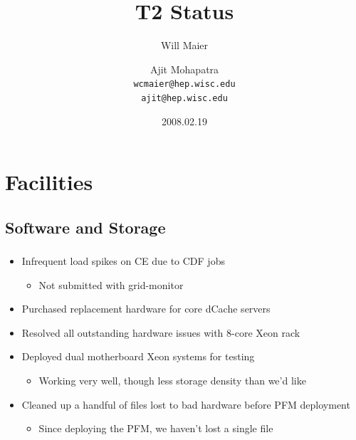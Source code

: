\documentclass{beamer}
\title{T2 Status}
\author[Maier, Mohapatra]{
    Will Maier \and Ajit Mohapatra\\ 
    {\tt wcmaier@hep.wisc.edu}\\
    {\tt ajit@hep.wisc.edu}}
\institute[Wisconsin]{University of Wisconsin - High Energy Physics}
\date{2008.02.19}
\begin{document}

\begin{frame}
    \titlepage
\end{frame}


\section{Facilities}
\subsection{Software and Storage}
\begin{frame}
\frametitle{}
\begin{itemize}
    \item Infrequent load spikes on CE due to CDF jobs
    \begin{itemize}
        \item Not submitted with grid-monitor
    \end{itemize}
    \item Purchased replacement hardware for core dCache servers
    \item Resolved all outstanding hardware issues with 8-core Xeon rack
    \item Deployed dual motherboard Xeon systems for testing
    \begin{itemize}
        \item Working very well, though less storage density than we'd like
    \end{itemize}
    \item Cleaned up a handful of files lost to bad hardware before PFM deployment
    \begin{itemize}
        \item Since deploying the PFM, we haven't lost a single file
    \end{itemize}
\end{itemize}
\end{frame}
\end{document}
